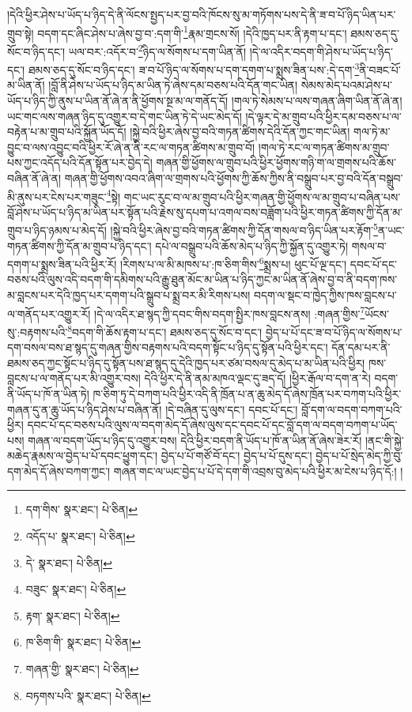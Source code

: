 །དེའི་ཕྱིར་ཤེས་པ་ཡོད་པ་ཉིད་དེ་ནི་ལོངས་སྤྱད་པར་བྱ་བའི་ཁོངས་སུ་མ་གཏོགས་པས་དེ་ནི་ཟ་བ་པོ་ཉིད་ཡིན་པར་གྲུབ་སྟེ། བདག་དང་ཞིང་ཤེས་པ་ཞེས་བྱ་བ་:དག་གི་\footnote{དག་གིས་  སྣར་ཐང་།  པེ་ཅིན། }རྣམ་གྲངས་སོ། །དེའི་ཁྱད་པར་ནི་རྟག་པ་དང་། ཐམས་ཅད་དུ་སོང་བ་ཉིད་དང་། ཡལ་བར་:འདོར་བ་\footnote{འདོད་པ་  སྣར་ཐང་།  པེ་ཅིན། }ཉིད་ལ་སོགས་པ་དག་ཡིན་ནོ། །དེ་ལ་འདིར་བདག་གི་ཤེས་པ་ཡོད་པ་ཉིད་དང་། ཐམས་ཅད་དུ་སོང་བ་ཉིད་དང་། ཟ་བ་པོ་ཉིད་ལ་སོགས་པ་དག་དགག་པ་སྨྲས་ཟིན་པས་:དེ་དག་\footnote{དེ་  སྣར་ཐང་།  པེ་ཅིན། }ནི་བཟང་པོ་མ་ཡིན་ནོ། །བློ་ནི་ཤེས་པ་ཡོད་པ་ཉིད་མ་ཡིན་ཏེ་ཞེས་དམ་བཅས་པའི་དོན་གང་ཡིན། སེམས་མེད་པའམ་ཤེས་པ་ཡོད་པ་ཉིད་ཀྱི་ནུས་པ་ཡིན་ནོ་ཞེ་ན་ནི་ཕྱོགས་སྔ་མ་ལ་གནོད་དོ། །གལ་ཏེ་སེམས་པ་ལས་གཞན་ཞིག་ཡིན་ནོ་ཞེ་ན། ཡང་གང་ལས་གཞན་ཉིད་དུ་འགྱུར་བ་དེ་གང་ཡིན་ཏེ་དེ་ཡང་མེད་དོ། །དེ་ལྟར་དེ་མ་གྲུབ་པའི་ཕྱིར་དམ་བཅས་པ་ལ་བརྟེན་པ་མ་གྲུབ་པའི་སྐྱོན་ཡོད་དོ། །སྐྱེ་བའི་ཕྱིར་ཞེས་བྱ་བའི་གཏན་ཚིགས་དེའི་དོན་ཀྱང་གང་ཡིན། གལ་ཏེ་མ་བྱུང་བ་ལས་འབྱུང་བའི་ཕྱིར་རོ་ཞེ་ན་ནི་རང་ལ་གཏན་ཚིགས་མ་གྲུབ་བོ། །གལ་ཏེ་རང་ལ་གཏན་ཚིགས་མ་གྲུབ་པས་ཀྱང་འདོད་པའི་དོན་སྟོན་པར་བྱེད་དེ། གཞན་གྱི་ཕྱོགས་ལ་གྲུབ་པའི་ཕྱིར་ཕྱོགས་གཉི་ག་ལ་གྲགས་པའི་ཆོས་བཞིན་ནོ་ཞེ་ན། གཞན་གྱི་ཕྱོགས་འབའ་ཞིག་ལ་གྲགས་པའི་ཕྱོགས་ཀྱི་ཆོས་ཀྱིས་ནི་བསྒྲུབ་པར་བྱ་བའི་དོན་བསྒྲུབ་མི་ནུས་པར་ངེས་པར་གཟུང་\footnote{བཟུང་  སྣར་ཐང་།  པེ་ཅིན། }སྟེ། གང་ཡང་རུང་བ་ལ་མ་གྲུབ་པའི་ཕྱིར་གཞན་གྱི་ཕྱོགས་ལ་མ་གྲུབ་པ་བཞིན་པས་བློ་ཤེས་པ་ཡོད་པ་ཉིད་མ་ཡིན་པར་སྟོན་པའི་རྗེས་སུ་དཔག་པ་འགལ་བས་བཟློག་པའི་ཕྱིར་གཏན་ཚིགས་ཀྱི་དོན་མ་གྲུབ་པ་ཉིད་ཉམས་པ་མེད་དོ། །སྐྱེ་བའི་ཕྱིར་ཞེས་བྱ་བའི་གཏན་ཚིགས་ཀྱི་དོན་གསལ་བ་ཉིད་ཡིན་པར་རྟོག་\footnote{རྟག་  སྣར་ཐང་།  པེ་ཅིན། }ན་ཡང་གཏན་ཚིགས་ཀྱི་དོན་མ་གྲུབ་པ་ཉིད་དང་། དཔེ་ལ་བསྒྲུབ་པའི་ཆོས་མེད་པ་ཉིད་ཀྱི་སྐྱོན་དུ་འགྱུར་ཏེ། གསལ་བ་དགག་པ་སྨྲས་ཟིན་པའི་ཕྱིར་རོ། །རིགས་པ་ལ་མི་མཁས་པ་:ཁ་ཅིག་གིས་\footnote{ཁ་ཅིག་གི་  སྣར་ཐང་།  པེ་ཅིན། }སྨྲས་པ། ཕུང་པོ་ལྔ་དང་། དབང་པོ་དང་བཅས་པའི་ལུས་འདི་བདག་གི་དམིགས་པའི་རྒྱུ་ཐུན་མོང་མ་ཡིན་པ་ཉིད་ཀྱང་མ་ཡིན་ནོ་ཞེས་བྱ་བ་ནི་བདག་ཁས་མ་བླངས་པར་དེའི་ཁྱད་པར་དགག་པའི་སྒྲུབ་པ་སྨྲ་བར་མི་རིགས་པས། བདག་ལ་སྡང་བ་ཁྱེད་ཀྱིས་ཁས་བླངས་པ་ལ་གནོད་པར་འགྱུར་རོ། །དེ་ལ་འདིར་ཐ་སྙད་ཀྱི་དབང་གིས་བདག་སྤྱིར་ཁས་བླངས་ནས། :གཞན་གྱིས་\footnote{གཞན་གྱི་  སྣར་ཐང་།  པེ་ཅིན། }ཡོངས་སུ་:བརྟགས་པའི་\footnote{བཏགས་པའི་  སྣར་ཐང་།  པེ་ཅིན། }བདག་གི་ཆོས་རྟག་པ་དང་། ཐམས་ཅད་དུ་སོང་བ་དང་། བྱེད་པ་པོ་དང་ཟ་བ་པོ་ཉིད་ལ་སོགས་པ་དག་བསལ་བས་ཐ་སྙད་དུ་གཞན་གྱིས་བརྟགས་པའི་བདག་སྟོང་པ་ཉིད་དུ་སྟོན་པའི་ཕྱིར་དང་། དོན་དམ་པར་ནི་ཐམས་ཅད་ཀྱང་སྟོང་པ་ཉིད་དུ་སྟོན་པས་ཐ་སྙད་དུ་དེའི་ཁྱད་པར་ཙམ་བསལ་དུ་མེད་པ་མ་ཡིན་པའི་ཕྱིར། ཁས་བླངས་པ་ལ་གནོད་པར་མི་འགྱུར་བས། དེའི་ཕྱིར་དེ་ནི་ནམ་མཁའ་ལྡང་དུ་ཟད་དོ། །ཕྱིར་རྒོལ་བ་དག་ན་རེ། བདག་ནི་ཡོད་པ་ཁོ་ན་ཡིན་ཏེ། ཁ་ཅིག་ཏུ་དེ་བཀག་པའི་ཕྱིར་འདི་ནི་ཁྲོན་པ་ན་ཆུ་མེད་དོ་ཞེས་ཁྲོན་པར་བཀག་པའི་ཕྱིར་གཞན་དུ་ན་ཆུ་ཡོད་པ་ཉིད་ཤེས་པ་བཞིན་ནོ། །དེ་བཞིན་དུ་ལུས་དང་། དབང་པོ་དང་། བློ་དག་ལ་བདག་བཀག་པའི་ཕྱིར། དབང་པོ་དང་བཅས་པའི་ལུས་ལ་བདག་མེད་དོ་ཞེས་ལུས་དང་དབང་པོ་དང་བློ་དག་ལ་བདག་བཀག་པ་ཡོད་པས། གཞན་ལ་བདག་ཡོད་པ་ཉིད་དུ་འགྱུར་བས། དེའི་ཕྱིར་བདག་ནི་ཡོད་པ་ཁོ་ན་ཡིན་ནོ་ཞེས་ཟེར་རོ། །ནང་གི་སྐྱེ་མཆེད་རྣམས་ལ་བྱེད་པ་པོ་དབང་ཕྱུག་དང་། བྱེད་པ་པོ་གཙོ་བོ་དང་། བྱེད་པ་པོ་དུས་དང་། བྱེད་པ་པོ་སྲེད་མེད་ཀྱི་བུ་དག་མེད་དོ་ཞེས་བཀག་ཀྱང་། གཞན་གང་ལ་ཡང་བྱེད་པ་པོ་དེ་དག་གི་འབྲས་བུ་མེད་པའི་ཕྱིར་མ་ངེས་པ་ཉིད་དོ:། །
